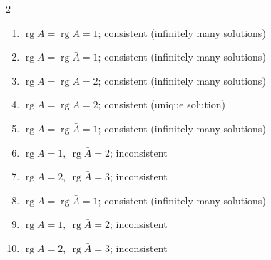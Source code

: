 \begin{multicols}{2}
\begin{enumerate}[label=\arabic*., leftmargin=*, itemsep=1pt]
\item $\operatorname{rg}A=\operatorname{rg}\bar A=1$; consistent (infinitely many solutions)
\item $\operatorname{rg}A=\operatorname{rg}\bar A=1$; consistent (infinitely many solutions)
\item $\operatorname{rg}A=\operatorname{rg}\bar A=2$; consistent (infinitely many solutions)
\item $\operatorname{rg}A=\operatorname{rg}\bar A=2$; consistent (unique solution)
\item $\operatorname{rg}A=\operatorname{rg}\bar A=1$; consistent (infinitely many solutions)
\item $\operatorname{rg}A=1,\ \operatorname{rg}\bar A=2$; inconsistent
\item $\operatorname{rg}A=2,\ \operatorname{rg}\bar A=3$; inconsistent
\item $\operatorname{rg}A=\operatorname{rg}\bar A=1$; consistent (infinitely many solutions)
\item $\operatorname{rg}A=1,\ \operatorname{rg}\bar A=2$; inconsistent
\item $\operatorname{rg}A=2,\ \operatorname{rg}\bar A=3$; inconsistent
\end{enumerate}
\end{multicols}
